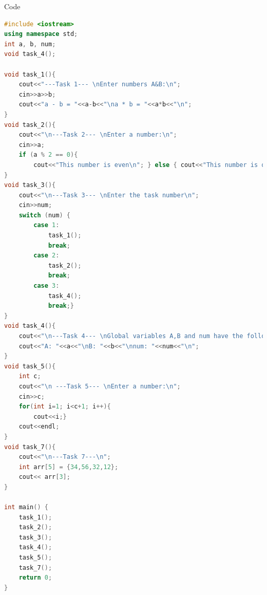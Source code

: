 \documentclass[a4paper,12pt]{article}
\begin{document}
\newpage
    \begin{center}
        \Large{Code}
    \end{center}
    \begin{lstlisting}[language=C++]
#include <iostream>
using namespace std;
int a, b, num;
void task_4();

void task_1(){
    cout<<"---Task 1--- \nEnter numbers A&B:\n";
    cin>>a>>b;
    cout<<"a - b = "<<a-b<<"\na * b = "<<a*b<<"\n";
}
void task_2(){
    cout<<"\n---Task 2--- \nEnter a number:\n";
    cin>>a;
    if (a % 2 == 0){
        cout<<"This number is even\n"; } else { cout<<"This number is odd\n"; }
}
void task_3(){
    cout<<"\n---Task 3--- \nEnter the task number\n";
    cin>>num;
    switch (num) {
        case 1:
            task_1();
            break;
        case 2:
            task_2();
            break;
        case 3:
            task_4();
            break;}
}
void task_4(){
    cout<<"\n---Task 4--- \nGlobal variables A,B and num have the following values:\n";
    cout<<"A: "<<a<<"\nB: "<<b<<"\nnum: "<<num<<"\n";
}
void task_5(){
    int c;
    cout<<"\n ---Task 5--- \nEnter a number:\n";
    cin>>c;
    for(int i=1; i<c+1; i++){
        cout<<i;}
    cout<<endl;
}
void task_7(){
    cout<<"\n---Task 7---\n";
    int arr[5] = {34,56,32,12};
    cout<< arr[3];
}

int main() {    
    task_1();
    task_2();
    task_3();
    task_4();
    task_5();
    task_7();
    return 0;
}
    \end{lstlisting}
\end{document}
